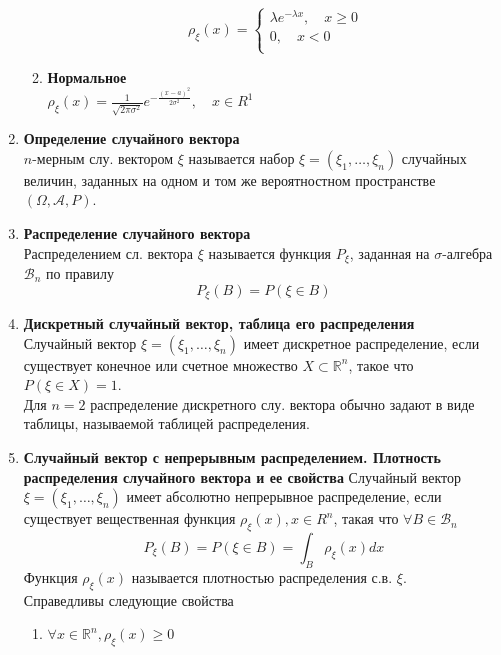 \documentclass[A4]{article}
\begin{document}
\begin{enumerate}
\begin{enumerate}
		\begin{equation}
		\rho_{\xi}(x)=\left\{\begin{array}{l}
		\lambda e^{-\lambda x},\quad x\ge 0\\
		0,\quad x<0\\
		\end{array}\right.
		\end{equation}
		\item \textbf{Нормальное}\\
		$\rho_{\xi}(x)=\frac{1}{\sqrt{2\pi\sigma^2}}e^{-\frac{(x-a)^2}{2\sigma^2}},\quad x\in R^1$
		\end{enumerate}
		\item \textbf{Определение случайного вектора}\\
		$n$-мерным слу. вектором $\xi$ называется набор $\xi=(\xi_1,\ldots,\xi_n)$ случайных величин, заданных на одном и том же вероятностном пространстве $(\Omega,\mathcal{A},P)$.
		\item \textbf{Распределение случайного вектора}\\
		Распределением сл. вектора $\xi$  называется функция $P_{\xi}$, заданная на $\sigma$-алгебра $\mathcal{B}_n$ по правилу
		\begin{equation}
		P_{\xi}(B)=P(\xi\in B)
		\end{equation}  
		\item \textbf{Дискретный случайный вектор, таблица его распределения}\\
		Случайный вектор $\xi=(\xi_1,\ldots,\xi_n)$ имеет дискретное распределение, если существует конечное или счетное множество $X\subset \mathbb{R}^n$, такое что $P(\xi\in X)=1$.\\
		Для $n=2$ распределение дискретного слу. вектора обычно задают в виде таблицы, называемой таблицей распределения. 
		\item \textbf{Случайный вектор с непрерывным распределением. Плотность распределения случайного вектора и ее свойства}
		Случайный вектор $\xi=(\xi_1,\ldots ,\xi_n)$ имеет абсолютно непрерывное распределение, если существует вещественная функция $\rho_{\xi}(x), x\in R^n$, такая что $\forall B\in\mathcal{B}_n$
		\begin{equation}
		P_{\xi}(B)=P(\xi\in B)=\int_{B}\rho_{\xi}(x)dx
		\end{equation} 
		Функция $\rho_{\xi}(x)$ называется плотностью распределения с.в. $\xi$.\\
		Справедливы следующие свойства
		\begin{enumerate}
			\item $\forall x\in \mathbb{R}^n,\rho_{\xi}(x)\ge0$

\end{enumerate}
\end{enumerate}
\end{document}
